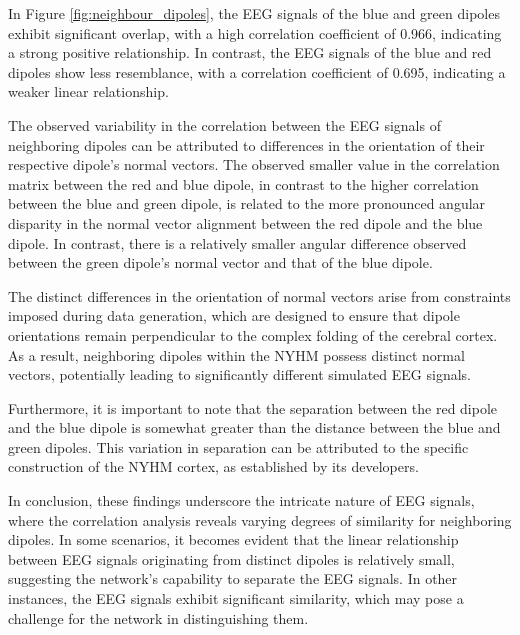 \documentclass[a4paper, UKenglish, 11pt]{uiomaster}
\begin{document}
In Figure \ref{fig:neighbour_dipoles}, the EEG signals of the blue and green dipoles exhibit significant overlap, with a high correlation coefficient of 0.966, indicating a strong positive relationship. In contrast, the EEG signals of the blue and red dipoles show less resemblance, with a correlation coefficient of 0.695, indicating a weaker linear relationship.

The observed variability in the correlation between the EEG signals of neighboring dipoles can be attributed to differences in the orientation of their respective dipole's normal vectors. The observed smaller value in the correlation matrix between the red and blue dipole, in contrast to the higher correlation between the blue and green dipole, is related to the more pronounced angular disparity in the normal vector alignment between the red dipole and the blue dipole. In contrast, there is a relatively smaller angular difference observed between the green dipole's normal vector and that of the blue dipole.

The distinct differences in the orientation of normal vectors arise from constraints imposed during data generation, which are designed to ensure that dipole orientations remain perpendicular to the complex folding of the cerebral cortex. As a result, neighboring dipoles within the NYHM possess distinct normal vectors, potentially leading to significantly different simulated EEG signals.

Furthermore, it is important to note that the separation between the red dipole and the blue dipole is somewhat greater than the distance between the blue and green dipoles. This variation in separation can be attributed to the specific construction of the NYHM cortex, as established by its developers.

In conclusion, these findings underscore the intricate nature of EEG signals, where the correlation analysis reveals varying degrees of similarity for neighboring dipoles. In some scenarios, it becomes evident that the linear relationship between EEG signals originating from distinct dipoles is relatively small, suggesting the network's capability to separate the EEG signals. In other instances, the EEG signals exhibit significant similarity, which may pose a challenge for the network in distinguishing them.


\end{document}
